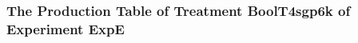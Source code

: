  \begin{frame}
 \fontsize{8pt}{9pt}\selectfont
 \frametitle{ The Production Table of Treatment BoolT4sgp6k of Experiment ExpE }

 \label{ExpEGrammarTable007.tex}  
 \end{frame}

